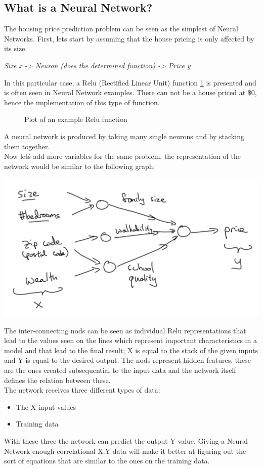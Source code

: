 \documentclass[11pt]{report}
\begin{document}
\subsection*{What is a Neural Network?}
The housing price prediction problem can be seen as the simplest of Neural Networks. First, lets start by assuming that the house pricing is only affected by its size.
\begin{center}
	\textit{Size x -> Neuron (does the determined function) -> Price y}
\end{center}
In this particular case, a Relu (Rectified Linear Unit) function \ref{fig:F1} is presented and is often seen in Neural Network examples. There can not be a house priced at \$0, hence the implementation of this type of function.
\begin{figure}
	\centering
	\caption{Plot of an example Relu function} \label{fig:F1}
\end{figure}
A neural network is produced by taking many single neurons and by stacking them together. \\
Now let\'s add more variables for the same problem, the representation of the network would be similar to the following graph:
\begin{center}
	\includegraphics[width = .50\textwidth]{HPP.png}
\end{center}
The inter-connecting nods can be seen as individual Relu representations that lead to the values seen on the lines which represent important characteristics in a model and that lead to the final result; X is equal to the stack of the given inputs and Y is equal to the desired output. The  nods represent hidden features, these are the ones created subsequential to the input data and the network itself defines the relation between these.\\
The network receives three different types of data:
\begin{itemize}
	\item The X input values
	\item Training data
\end{itemize}
With these three the network can predict the output Y value. Giving a Neural Network enough correlational X:Y data will make it better at figuring out the sort of equations that are similar to the ones on the training data.
\end{document}
